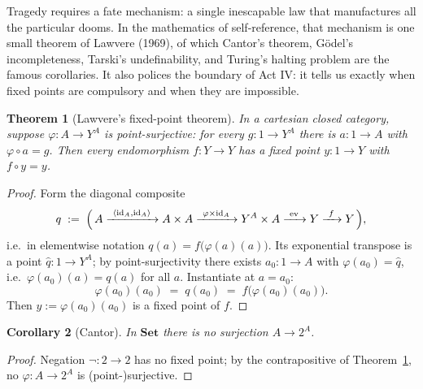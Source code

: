 \documentclass[11pt]{article}
\theoremstyle{plain}
\newtheorem{theorem}{Theorem}[section]
\newtheorem{corollary}[theorem]{Corollary}
\theoremstyle{definition}
\theoremstyle{remark}
\newcommand{\Set}{\mathbf{Set}}
\newcommand{\id}{\operatorname{id}}
\newcommand{\ev}{\operatorname{ev}}
\begin{document}
Tragedy requires a fate mechanism: a single inescapable law that manufactures all the particular dooms. In the mathematics of self-reference, that mechanism is one small theorem of Lawvere (1969), of which Cantor's theorem, G\"odel's incompleteness, Tarski's undefinability, and Turing's halting problem are the famous corollaries. It also polices the boundary of Act IV: it tells us exactly when fixed points are compulsory and when they are impossible.

\begin{theorem}[Lawvere's fixed-point theorem]\label{thm:lawvere}
In a cartesian closed category, suppose $\varphi\colon A \to Y^A$ is point-surjective: for every $g\colon 1 \to Y^A$ there is $a\colon 1 \to A$ with $\varphi \circ a = g$. Then every endomorphism $f\colon Y \to Y$ has a fixed point $y\colon 1 \to Y$ with $f \circ y = y$.
\end{theorem}

\begin{proof}
Form the diagonal composite
\[
q \;:=\; \Bigl(\, A \xrightarrow{\ \langle \id_A, \id_A\rangle\ } A \times A \xrightarrow{\ \varphi \times \id_A\ } Y^A \times A \xrightarrow{\ \ev\ } Y \xrightarrow{\ f\ } Y \,\Bigr),
\]
i.e.\ in elementwise notation $q(a) = f\bigl(\varphi(a)(a)\bigr)$. Its exponential transpose is a point $\widehat{q}\colon 1 \to Y^A$; by point-surjectivity there exists $a_0\colon 1 \to A$ with $\varphi(a_0) = \widehat{q}$, i.e.\ $\varphi(a_0)(a) = q(a)$ for all $a$. Instantiate at $a = a_0$:
\[
\varphi(a_0)(a_0) \;=\; q(a_0) \;=\; f\bigl(\varphi(a_0)(a_0)\bigr).
\]
Then $y := \varphi(a_0)(a_0)$ is a fixed point of $f$.
\end{proof}

\begin{corollary}[Cantor]\label{cor:cantor}
In $\Set$ there is no surjection $A \to 2^A$.
\end{corollary}

\begin{proof}
Negation $\neg\colon 2 \to 2$ has no fixed point; by the contrapositive of Theorem~\ref{thm:lawvere}, no $\varphi\colon A \to 2^A$ is (point-)surjective.
\end{proof}
\end{document}
